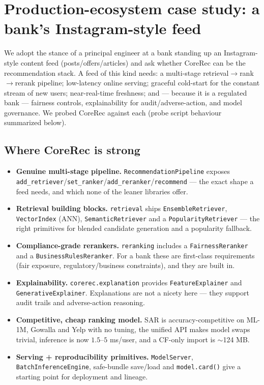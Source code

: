 \documentclass[10pt]{article}
\begin{document}
\section{Production-ecosystem case study: a bank's Instagram-style feed}
\label{sec:bankfeed}
We adopt the stance of a principal engineer at a bank standing up an
Instagram-style content feed (posts/offers/articles) and ask whether CoreRec can
be the recommendation stack. A feed of this kind needs: a multi-stage
retrieval$\rightarrow$rank$\rightarrow$rerank pipeline; low-latency online serving;
graceful cold-start for the constant stream of new users; near-real-time freshness;
and --- because it is a regulated bank --- fairness controls, explainability for
audit/adverse-action, and model governance. We probed CoreRec against each
(probe script behaviour summarized below).

\subsection*{Where CoreRec is strong}
\begin{itemize}
\item \textbf{Genuine multi-stage pipeline.} \texttt{RecommendationPipeline} exposes
\texttt{add\_retriever}/\texttt{set\_ranker}/\texttt{add\_reranker}/\texttt{recommend}
--- the exact shape a feed needs, and which none of the leaner libraries offer.
\item \textbf{Retrieval building blocks.} \texttt{retrieval} ships
\texttt{EnsembleRetriever}, \texttt{VectorIndex} (ANN), \texttt{SemanticRetriever}
and a \texttt{PopularityRetriever} --- the right primitives for blended candidate
generation and a popularity fallback.
\item \textbf{Compliance-grade rerankers.} \texttt{reranking} includes a
\texttt{FairnessReranker} and a \texttt{BusinessRulesReranker}. For a bank these
are first-class requirements (fair exposure, regulatory/business constraints), and
they are built in.
\item \textbf{Explainability.} \texttt{corerec.explanation} provides
\texttt{FeatureExplainer} and \texttt{GenerativeExplainer}. Explanations are not a
nicety here --- they support audit trails and adverse-action reasoning.
\item \textbf{Competitive, cheap ranking model.} SAR is accuracy-competitive on
ML-1M, Gowalla and Yelp with no tuning, the unified API makes model swaps trivial,
inference is now $1.5$--$5$ ms/user, and a CF-only import is $\sim$124 MB.
\item \textbf{Serving + reproducibility primitives.} \texttt{ModelServer},
\texttt{BatchInferenceEngine}, safe-bundle save/load and \texttt{model.card()}
give a starting point for deployment and lineage.
\end{itemize}
\end{document}
